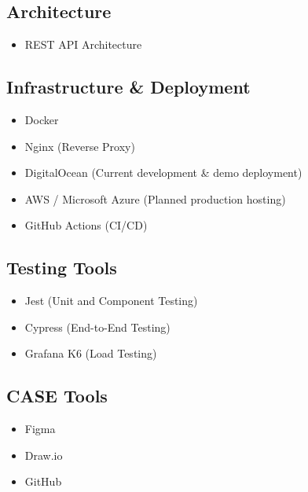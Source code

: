 \subsection{Architecture}
\begin{itemize}
    \item REST API Architecture
\end{itemize}

\subsection{Infrastructure \& Deployment}
\begin{itemize}
    \item Docker
    \item Nginx (Reverse Proxy)
    \item DigitalOcean (Current development \& demo deployment)
    \item AWS / Microsoft Azure (Planned production hosting)
    \item GitHub Actions (CI/CD)
\end{itemize}

\subsection{Testing Tools}
\begin{itemize}
    \item Jest (Unit and Component Testing)
    \item Cypress (End-to-End Testing)
    \item Grafana K6 (Load Testing)
\end{itemize}

\subsection{CASE Tools}
\begin{itemize}
    \item Figma
    \item Draw.io
    \item GitHub
\end{itemize}